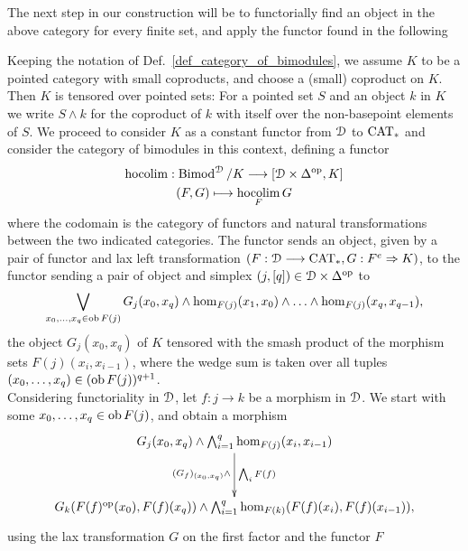   The next step in our construction will be to functorially find an object in
  the above category for every finite set, and apply the functor found in the
  following
  \begin{defn}\label{def_hocolim}
    Keeping the notation of Def.~\ref{def_category_of_bimodules}, we assume
    $K$ to be a pointed category with small coproducts, and choose a (small)
    coproduct on $K$.  Then $K$ is tensored over pointed sets: For a pointed
    set $S$ and an object $k$ in $K$ we write $S \wedge k$ for the coproduct
    of $k$ with itself over the non-basepoint elements of $S$.
    We proceed to consider $K$ as a constant functor from $\mathcal{D}$ to $\mathrm{CAT}_*$
    and consider the category of bimodules in this context, defining a functor
    \begin{gather*}
      \hocolim: \operatorname{Bimod}^{\cD} / K \to %
        [\cD \times \Delta^{\mathrm{op}}, K]\\
      (F,G) \mapsto \hocolim_F G
    \end{gather*}
    where the codomain is the category of functors and natural transformations
    between the two indicated categories.
    The functor sends an object, given by a pair of functor and lax left
    transformation $(F: \mathcal{D} \longrightarrow \mathrm{CAT}_*, G: F^e \Rightarrow K)$, to the functor
    sending a pair of object and simplex $(j,[q]) \in \mathcal{D} \times
    \Delta^\mathrm{op}$ to
    \begin{displaymath}
      \bigvee_{x_0, \ldots, x_q \in \ob F(j)} %
        G_j(x_0,x_q) \wedge %
        \hom_{F(j)}(x_1,x_0) \wedge \ldots \wedge \hom_{F(j)}(x_q,x_{q-1}),
    \end{displaymath}
    the object $G_j(x_0,x_q)$ of $K$ tensored with the smash product of the
    morphism sets $F(j)(x_i,x_{i-1})$, where the wedge sum is taken over all
    tuples $(x_0, \ldots, x_q) \in (\operatorname{ob} F(j))^{q+1}$.\\
    Considering functoriality in $\mathcal{D}$, let $f \colon j \to k$ be a morphism in
    $\mathcal{D}$. We start with some $x_0, \ldots, x_q \in \operatorname{ob} F(j)$, and obtain a
    morphism
    \begin{displaymath}
      \xymatrix@R+1em{
        G_j(x_0,x_q) \wedge \bigwedge_{i=1}^q \hom_{F(j)}(x_i,x_{i-1}) %
          \ar[d]_{(G_f)_{(x_0,x_q)} \wedge}^{\bigwedge_i F(f)}
        \\
        G_k(F(f)^{\mathrm{op}}(x_0),F(f)(x_q)) \wedge %
          \bigwedge_{i=1}^q \hom_{F(k)}(F(f)(x_i),F(f)(x_{i-1})),  
      }
    \end{displaymath}
    using the lax transformation $G$ on the first factor and the functor $F$

\end{defn}
